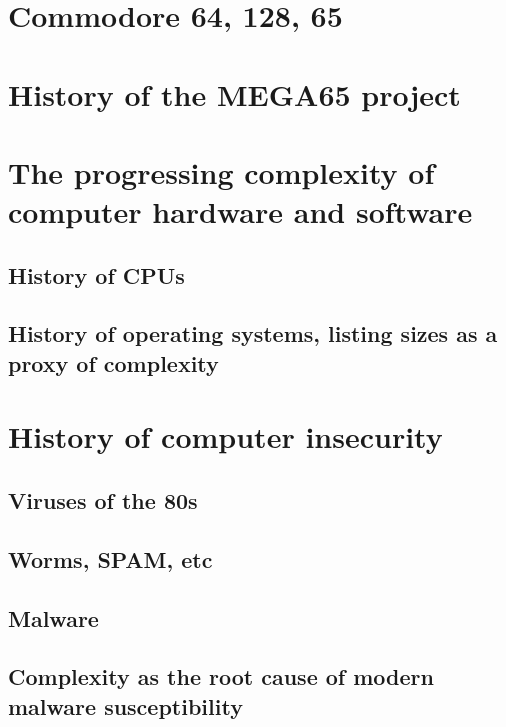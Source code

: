\section{Commodore 64, 128, 65}


\section{History of the MEGA65 project}


\section{The progressing complexity of computer hardware and software}


\subsection{History of CPUs}


\subsection{History of operating systems, listing sizes as a proxy of complexity}


\section{History of computer insecurity}


\subsection{Viruses of the 80s}


\subsection{Worms, SPAM, etc}


\subsection{Malware}


\subsection{Complexity as the root cause of modern malware susceptibility}